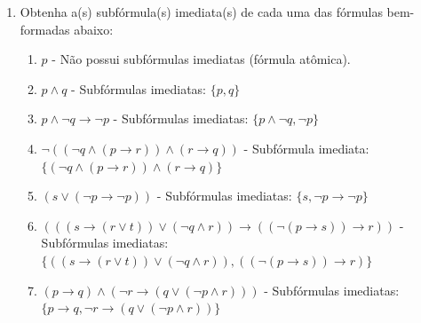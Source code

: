 \begin{enumerate}[label=\arabic*., left=0.5cm, align=left, nosep]
\begin{enumerate}[label=(\alph*), left=0.5cm, align=left, nosep]
                    \item $(s \rightarrow r \lor t) \lor (\neg q \land r) \rightarrow (\neg (p \rightarrow s) \rightarrow r)$
                    
                    Subfórmulas:\\
                    $\{
                    ((s \rightarrow (r \lor t)) \lor (\neg q \land r)) \rightarrow (\neg (p \rightarrow s) \rightarrow r),
                    \ (s \rightarrow (r \lor t)) \lor (\neg q \land r),
                    \ s \rightarrow (r \lor t),
                    \ s,
                    \ r \lor t,
                    \ r,
                    \ t,
                    \ \neg q \land r,
                    \ \neg q,
                    \ q,
                    \ r,
                    \ \neg (p \rightarrow s) \rightarrow r,
                    \ \neg (p \rightarrow s),
                    \ p \rightarrow s,
                    \ p \}$

                \end{enumerate} 

            \item Obtenha a(s) subfórmula(s) imediata(s) de cada uma das fórmulas bem-formadas abaixo:
                \begin{enumerate}[label=(\alph*), left=0.5cm, align=left, nosep]
                    \item $p$ - Não possui subfórmulas imediatas (fórmula atômica).
                    \item $p \land q$ - Subfórmulas imediatas: $\{ p,q \}$
                    \item $p \land \neg q \rightarrow \neg p$ - Subfórmulas imediatas: $\{ p \land \neg q, \neg p \}$
                    \item $\neg ((\neg q \land (p \rightarrow r)) \land (r \rightarrow q))$ - Subfórmula imediata: $ \{ (\neg q 
                    \land (p \rightarrow r)) \land (r \rightarrow q) \}$
                    \item $(s \lor (\neg p \rightarrow \neg p))$ - Subfórmulas imediatas: $\{ s, \neg p \rightarrow \neg p \}$
                    \item $(((s \rightarrow (r \lor t)) \lor (\neg q \land r)) \rightarrow ((\neg (p \rightarrow s)) \rightarrow 
                    r))$ - Subfórmulas imediatas: $ \{ ((s \rightarrow (r \lor t)) \lor (\neg q \land r)), ((\neg (p \rightarrow 
                    s)) \rightarrow r) \}$ 
                    \item $(p \rightarrow q) \land (\neg r \rightarrow (q \lor (\neg p \land r)))$ - Subfórmulas imediatas: $ \{ p 
                    \rightarrow q, \neg r \rightarrow (q \lor (\neg p \land r)) \}$
                \end{enumerate} 


\end{enumerate}
